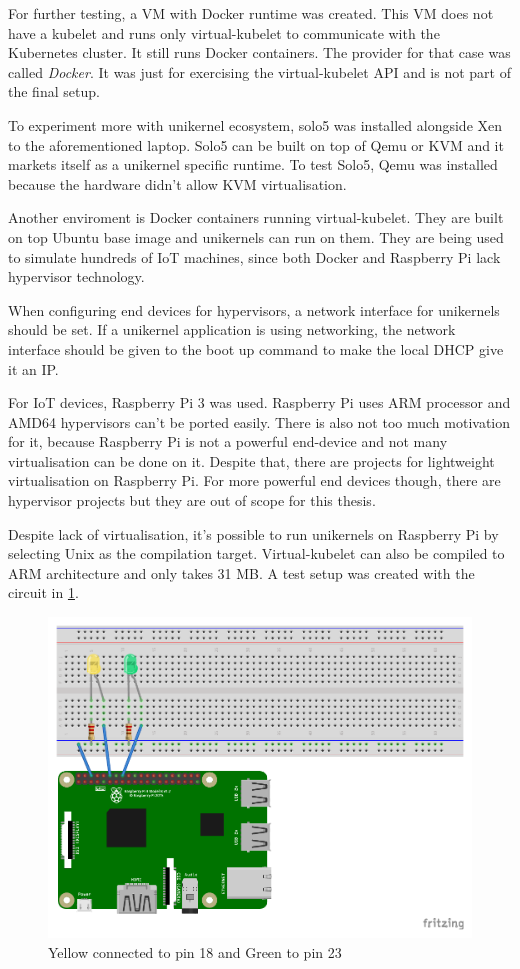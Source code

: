 For further testing, a VM with Docker runtime was created. This VM does not have a kubelet and runs only virtual-kubelet to communicate with the Kubernetes cluster. It still runs Docker containers. The provider for that case was called \textit{Docker}. It was just for exercising the virtual-kubelet API and is not part of the final setup.

To experiment more with unikernel ecosystem, solo5 was installed alongside Xen to the aforementioned laptop. Solo5 can be built on top of Qemu or KVM and it markets itself as a unikernel specific runtime. To test Solo5, Qemu was installed because the hardware didn't allow KVM virtualisation.

Another enviroment is Docker containers running virtual-kubelet. They are built on top Ubuntu base image and unikernels can run on them. They are being used to simulate hundreds of IoT machines, since both Docker and Raspberry Pi lack hypervisor technology.

When configuring end devices for hypervisors, a network interface for unikernels should be set. If a unikernel application is using networking, the network interface should be given to the boot up command to make the local DHCP give it an IP.


For IoT devices, Raspberry Pi 3 was used. Raspberry Pi uses ARM processor and AMD64 hypervisors can't be ported easily. There is also not too much motivation for it, because Raspberry Pi is not a powerful end-device and not many virtualisation can be done on it. Despite that, there are projects for lightweight virtualisation on Raspberry Pi. For more powerful end devices though, there are hypervisor projects but they are out of scope for this thesis.

Despite lack of virtualisation, it's possible to run unikernels on Raspberry Pi by selecting Unix as the compilation target. Virtual-kubelet can also be compiled to ARM architecture and only takes 31 MB. A test setup was created with the circuit in \ref{fig:rpi-diagram}.

\begin{figure}[htpb]
  \centering
  \includegraphics[height=0.5\textwidth]{figures/rpi-diagram.pdf}
  \caption{Yellow connected to pin 18 and Green to pin 23} \label{fig:rpi-diagram}
\end{figure}

